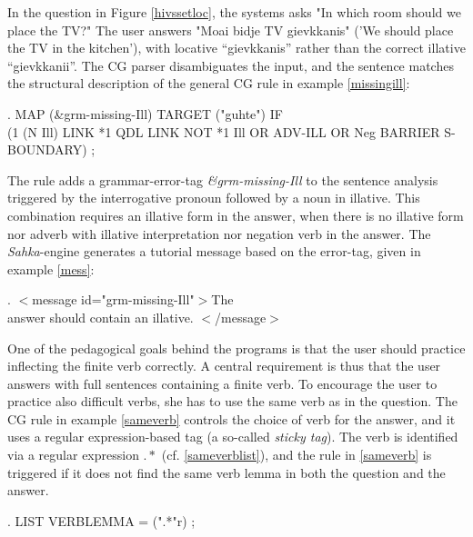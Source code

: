 \documentclass[11pt]{article}
\begin{document}
In the question in Figure \ref{hivssetloc}, the systems asks "In which room should we place the TV?" The user answers "Moai bidje TV gievkkanis" ('We should place the TV in the kitchen'), with locative “gievkkanis” rather than the correct illative “gievkkanii”. The CG parser disambiguates the input, and the sentence matches the structural description of the general CG rule in example \ref{missingill}: 

\ex.\flushleft\label{missingill} \small{MAP (\&grm-missing-Ill) TARGET ("guhte") IF \\(1 (N Ill) LINK *1 QDL LINK NOT *1 Ill OR ADV-ILL OR Neg BARRIER S-BOUNDARY) ;}

The rule adds a grammar-error-tag \textit{\&grm-missing-Ill} to the sentence analysis triggered by the interrogative pronoun followed by a noun in illative. This combination requires an illative form in the answer, when there is no illative form nor adverb with illative interpretation nor negation verb in the answer. The \textit{Sahka}-engine generates a tutorial message based on the error-tag, given in example \ref{mess}:  

\ex.\label{mess} \small{$<$message id="grm-missing-Ill"$>$The \\answer should contain an illative. $<$/message$>$}


One of the pedagogical goals behind the programs is that the user should practice inflecting the finite verb correctly. A central requirement is thus that the user answers with full sentences containing a finite verb. To encourage the user to practice also difficult verbs, she has to use the same verb as in the question. The CG rule in example \ref{sameverb} controls the choice of verb for the answer, and it uses a regular expression-based tag (a so-called \textit{sticky tag}). The verb is identified via a regular expression $.*$ (cf. \ref{sameverblist}), and the rule in \ref{sameverb} is triggered if it does not find the same verb lemma in both the question and the answer.

\ex.\flushleft\label{sameverblist} \small{LIST VERBLEMMA = (".*"r) ;}
\end{document}
